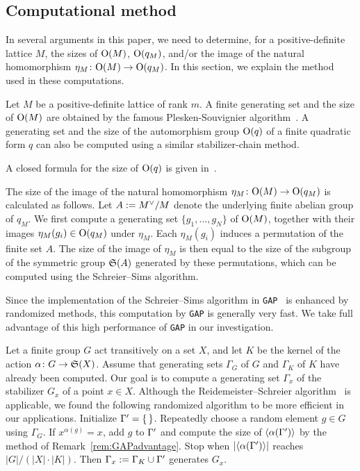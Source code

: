 \documentclass{amsart} %
\begin{document}
\subsection{Computational method}\label{subsec:computational}
%
In several arguments in this paper, 
we need to determine, for a positive-definite lattice $M$,  the sizes of $\mathord{\mathrm{O}}(M)$,
$\mathord{\mathrm{O}}(q_M)$, and/or 
the image of the natural homomorphism
$\eta_M\colon \mathord{\mathrm{O}}(M) \to \mathord{\mathrm{O}}(q_M)$.
In this section, we explain the method used in these computations.
%
\par
%
Let $M$ be a positive-definite lattice of rank $m$.
A finite generating set 
and the size of $\mathord{\mathrm{O}}(M)$ are obtained by the famous Plesken-Souvignier algorithm~\cite{MR1484483}.
A generating set and the size of the automorphism group $\mathord{\mathrm{O}}(q)$ of a finite quadratic form 
$q$ can also be computed using a similar stabilizer-chain method.
%
\begin{remark}
A closed formula for the size of $\mathord{\mathrm{O}}(q)$ is given in~\cite[Theorem 5.2]{MR4730253}.
\end{remark}
%
%
The size of the image of 
the natural homomorphism $\eta_M\colon \mathord{\mathrm{O}}(M)\to \mathord{\mathrm{O}}(q_M)$ is calculated as follows.
Let $A:=M^{\vee}/M$ denote the underlying finite abelian group of $q_M$.
We first compute a generating set $\{g_1, \dots, g_N\}$ of $\mathord{\mathrm{O}}(M)$,
together with their images $\eta_M(g_i)\in \mathord{\mathrm{O}}(q_M)$ under $\eta_M$.
Each $\eta_M(g_i)$ induces a permutation of the finite set $A$.
The size of the image of $\eta_M$ is 
then equal to the size of the subgroup of 
the symmetric group $\mathord{\mathfrak{S}}(A)$ generated by these permutations,
which can be computed using the Schreier--Sims algorithm.
%
\begin{remark}\label{rem:GAPadvantage}
Since the implementation of the Schreier--Sims algorithm in {\tt GAP}~\cite{GAP4} is enhanced by randomized methods,
this computation by {\tt GAP} is generally very fast.
We take full advantage of this high performance of {\tt GAP} in our investigation.
\end{remark}
%
%
\begin{remark}\label{rem:gensofstab}
Let a finite group $G$ act transitively on a set $X$,
and let $K$ be the kernel of the action $\alpha\colon G\to \mathord{\mathfrak{S}}(X)$.
Assume that generating sets $\Gamma_G$ of $G$ and $\Gamma_K$ of $K$ 
have already been computed.
Our goal is to compute a generating set 
$\Gamma_x$ of the stabilizer $G_x$ of a point $x\in X$.
Although the Reidemeister--Schreier algorithm~\cite[Chapter 2]{MR2109550}
is applicable, 
we found the following randomized algorithm to be more efficient
in our applications.
Initialize $\Gamma^{\prime}=\{\,\}$. 
Repeatedly choose a random element $g\in G$
using $\Gamma_G$. 
If $x^{\alpha(g)}=x$, add $g$ to $\Gamma^{\prime}$ and compute the size
of $\langle\alpha(\Gamma^{\prime})\rangle$ by the method of Remark~\ref{rem:GAPadvantage}.
Stop when $|\langle\alpha(\Gamma^{\prime})\rangle|$ reaches $|G|/({|X|\cdot |K|})$.
Then
$\Gamma_x:=\Gamma_K\cup\Gamma^{\prime}$
generates $G_x$.
\end{remark}
%
%
\end{document}
